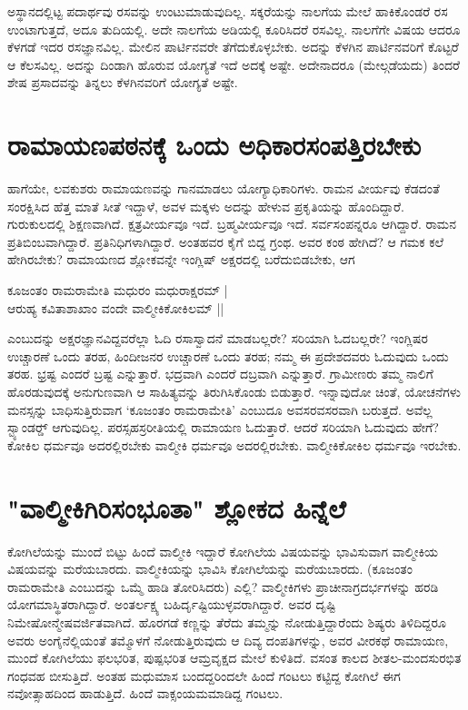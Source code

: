 ಅಸ್ಥಾನದಲ್ಲಿಟ್ಟ ಪದಾರ್ಥವು ರಸವನ್ನು ಉಂಟುಮಾಡುವುದಿಲ್ಲ. ಸಕ್ಕರೆಯನ್ನು ನಾಲಗೆಯ ಮೇಲೆ ಹಾಕಿಕೊಂಡರೆ ರಸ ಉಂಟಾಗುತ್ತದೆ, ಅದೂ ತುದಿಯಲ್ಲಿ. ಅದೇ ನಾಲಗೆಯ ಅಡಿಯಲ್ಲಿ ಕೂರಿಸಿದರೆ ರಸವಿಲ್ಲ. ನಾಲಗೆಗೇ ವಿಷಯ ಆದರೂ ಕೆಳಗಡೆ ಇದರ ರಸಜ್ಞಾನವಿಲ್ಲ. ಮೇಲಿನ ಪಾರ್ಟಿನವರೇ ತೆಗೆದುಕೊಳ್ಳಬೇಕು. ಅದನ್ನು ಕೆಳಗಿನ ಪಾರ್ಟಿನವರಿಗೆ ಕೊಟ್ಟರೆ ಆ ಕೆಲಸವಿಲ್ಲ. ಅದನ್ನು ದಿಂಡಾಗಿ ಹೊರುವ ಯೋಗ್ಯತೆ ಇದೆ ಅದಕ್ಕೆ ಅಷ್ಟೇ. ಅದೇನಾದರೂ (ಮೇಲ್ಗಡೆಯದು) ತಿಂದರೆ ಶೇಷ ಪ್ರಸಾದವನ್ನು ತಿನ್ನಲು ಕೆಳಗಿನವರಿಗೆ ಯೋಗ್ಯತೆ ಅಷ್ಟೇ. 

\section*{ರಾಮಾಯಣಪಠನಕ್ಕೆ ಒಂದು ಅಧಿಕಾರಸಂಪತ್ತಿರಬೇಕು} 

ಹಾಗೆಯೇ, ಲವಕುಶರು ರಾಮಾಯಣವನ್ನು ಗಾನಮಾಡಲು ಯೋಗ್ಯಾಧಿಕಾರಿಗಳು. ರಾಮನ ವೀರ್ಯವು ಕೆಡದಂತೆ ಸಂರಕ್ಷಿಸಿದ ಹೆತ್ತ ಮಾತೆ ಸೀತೆ ಇದ್ದಾಳೆ, ಅವಳ ಮಕ್ಕಳು ಅದನ್ನು ಹೇಳುವ ಪ್ರಕೃತಿಯನ್ನು ಹೊಂದಿದ್ದಾರೆ. ಗುರುಕುಲದಲ್ಲಿ ಶಿಕ್ಷಣವಾಗಿದೆ. ಕ್ಷತ್ರವೀರ್ಯವೂ ಇದೆ. ಬ್ರಹ್ಮವೀರ್ಯವೂ ಇದೆ. ಸರ್ವಸಂಪನ್ನರೂ ಆಗಿದ್ದಾರೆ. ರಾಮನ ಪ್ರತಿಬಿಂಬವಾಗಿದ್ದಾರೆ. ಪ್ರತಿನಿಧಿಗಳಾಗಿದ್ದಾರೆ. ಅಂತಹವರ ಕೈಗೆ ಬಿದ್ದ ಗ್ರಂಥ. ಅವರ ಕಂಠ ಹೇಗಿದೆ? ಆ ಗಮಕ ಕಲೆ ಹೇಗಿರಬೇಕು? ರಾಮಾಯಣದ ಶ್ಲೋಕವನ್ನೇ ಇಂಗ್ಲಿಷ್‍ ಅಕ್ಷರದಲ್ಲಿ ಬರೆದುಬಿಡಬೇಕು, ಆಗ 

\begin{shloka}
ಕೂಜಂತಂ ರಾಮರಾಮೇತಿ ಮಧುರಂ ಮಧುರಾಕ್ಷರಮ್‍ |\\ 
ಆರುಹ್ಯ ಕವಿತಾಶಾಖಾಂ ವಂದೇ ವಾಲ್ಮೀಕಿಕೋಕಿಲಮ್‍ || 
\end{shloka} 

ಎಂಬುದನ್ನು ಅಕ್ಷರಜ್ಞಾನವಿದ್ದವರೆಲ್ಲಾ ಓದಿ ರಸಾಸ್ವಾದನೆ ಮಾಡಬಲ್ಲರೇ? ಸರಿಯಾಗಿ ಓದಬಲ್ಲರೇ? ಇಂಗ್ಲಿಷರ ಉಚ್ಚಾರಣೆ ಒಂದು ತರಹ, ಹಿಂದೀಜನರ ಉಚ್ಚಾರಣೆ ಒಂದು ತರಹ; ನಮ್ಮ ಈ ಪ್ರದೇಶದವರು ಓದುವುದು ಒಂದು ತರಹ. ಭ್ರಷ್ಟ ಎಂದರೆ ಬ್ರಷ್ಟ ಎನ್ನುತ್ತಾರೆ. ಭದ್ರವಾಗಿ ಎಂದರೆ ದಬ್ರವಾಗಿ ಎನ್ನುತ್ತಾರೆ. ಗ್ರಾಮೀಣರು ತಮ್ಮ ನಾಲಿಗೆ ಹೊರಡುವುದಕ್ಕೆ ಅನುಗುಣವಾಗಿ ಆ ಸಾಹಿತ್ಯವನ್ನು ತಿರುಗಿಸಿಕೊಂಡು ಬಿಡುತ್ತಾರೆ. ಇನ್ನಾವುದೋ ಚಿಂತೆ, ಯೋಚನೆಗಳು ಮನಸ್ಸನ್ನು ಬಾಧಿಸುತ್ತಿರುವಾಗ `ಕೂಜಂತಂ ರಾಮರಾಮೇತಿ' ಎಂಬುದೂ ಅವಸರವಸರವಾಗಿ ಬರುತ್ತದೆ. ಅವೆಲ್ಲ ಸ್ಟ್ಯಾಂಡರ್ಡ್‍ ಆಗುವುದಿಲ್ಲ. ಪರಸ್ಸಹಸ್ರರೀತಿಯಲ್ಲಿ ರಾಮಾಯಣ ಓದುತ್ತಾರೆ. ಆದರೆ ಸರಿಯಾಗಿ ಓದುವುದು ಹೇಗೆ? ಕೋಕಿಲ ಧರ್ಮವೂ ಅದರಲ್ಲಿರಬೇಕು ವಾಲ್ಮೀಕಿ ಧರ್ಮವೂ ಅದರಲ್ಲಿರಬೇಕು. ವಾಲ್ಮೀಕಿಕೋಕಿಲ ಧರ್ಮವೂ ಇರಬೇಕು. 

\section*{"ವಾಲ್ಮೀಕಿಗಿರಿಸಂಭೂತಾ" ಶ್ಲೋಕದ ಹಿನ್ನೆಲೆ} 

ಕೋಗಿಲೆಯನ್ನು ಮುಂದೆ ಬಿಟ್ಟು ಹಿಂದೆ ವಾಲ್ಮೀಕಿ ಇದ್ದಾರೆ ಕೋಗಿಲೆಯ ವಿಷಯವನ್ನು ಭಾವಿಸುವಾಗ ವಾಲ್ಮೀಕಿಯ ವಿಷಯವನ್ನು ಮರೆಯಬಾರದು. ವಾಲ್ಮೀಕಿಯನ್ನು ಭಾವಿಸಿ ಕೋಗಿಲೆಯನ್ನು ಮರೆಯಬಾರದು. (ಕೂಜಂತಂ ರಾಮರಾಮೇತಿ ಎಂಬುದನ್ನು ಒಮ್ಮೆ ಹಾಡಿ ತೋರಿಸಿದರು) ಎಲ್ಲಿ? ವಾಲ್ಮೀಕಿಗಳು ಪ್ರಾಚೀನಾಗ್ರದರ್ಭಗಳನ್ನು ಹರಡಿ ಯೋಗಮಾಸ್ಥಿತರಾಗಿದ್ದಾರೆ. ಅಂತರ್ಲಕ್ಷ್ಯ ಬಹಿರ್ದೃಷ್ಟಿಯುಳ್ಳವರಾಗಿದ್ದಾರೆ. ಅವರ ದೃಷ್ಟಿ ನಿಮೇಷೋನ್ಮೇಷವರ್ಜಿತವಾಗಿದೆ. ಹೊರಗಡೆ ಕಣ್ಣನ್ನು ತೆರೆದು ತಮ್ಮನ್ನು ನೋಡುತ್ತಿದ್ದಾರೆಂದು ಶಿಷ್ಯರು ತಿಳಿದಿದ್ದರೂ ಅವರು ಅಂಗೈನೆಲ್ಲಿಯಂತೆ ತಮ್ಮೊಳಗೆ ನೋಡುತ್ತಿರುವುದು ಆ ದಿವ್ಯ ದಂಪತಿಗಳನ್ನು, ಅವರ ವೀರಕಥೆ ರಾಮಾಯಣ, ಮುಂದೆ ಕೋಗಿಲೆಯು ಫಲಭರಿತ, ಪುಷ್ಪಭರಿತ ಆಮ್ರವೃಕ್ಷದ ಮೇಲೆ ಕುಳಿತಿದೆ. ವಸಂತ ಕಾಲದ ಶೀತಲ-ಮಂದಸುರಭಿತ ಗಂಧವಹ ಬೀಸುತ್ತಿದೆ. ಅಂತಹ ಮಧುಮಾಸ ಬಂದದ್ದರಿಂದಲೇ ಹಿಂದೆ ಗಂಟಲು ಕಟ್ಟಿದ್ದ ಕೋಗಿಲೆ ಈಗ ನವೋತ್ಸಾಹದಿಂದ ಹಾಡುತ್ತಿದೆ. ಹಿಂದೆ ವಾಕ್ಸಂಯಮಮಾಡಿದ್ದ ಗಂಟಲು. 

